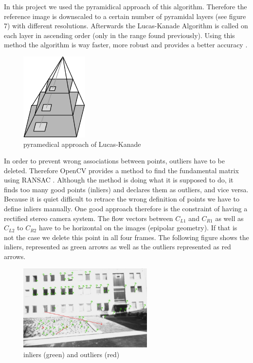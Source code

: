 \documentclass[11pt]{article}
\begin{document}
	In this project we used the pyramidical approach of this algorithm. Therefore the reference image is downscaled to a certain number of pyramidal layers (see figure 7) with different resolutions. Afterwards the Lucas-Kanade Algorithm is called on each layer in ascending order (only in the range found previously). Using this method the algorithm is way faster, more robust and provides a better accuracy \cite{Lucas_Kanade_TU_dresden}.

	\begin{figure}[H]
		\centering
		\includegraphics[width=0.3\textwidth]{images/pyramidical.png}
		\caption{pyramedical approach of Lucas-Kanade}
	\end{figure}
	
	In order to prevent wrong associations between points, outliers have to be deleted. Therefore OpenCV provides a method to find the fundamental matrix using RANSAC \cite{findFundamentalMat}. Although the method is doing what it is supposed to do, it finds too many good points (inliers) and declares them as outliers, and vice versa. Because it is quiet difficult to retrace the wrong definition of points we have to define inliers manually. One good approach therefore is the constraint of having a rectified stereo camera system. The flow vectors between $C_{L1}$ and $C_{R1}$ as well as $C_{L2}$ to $C_{R2}$ have to be horizontal on the images (epipolar geometry). If that is not the case we delete this point in all four frames. The following figure shows the inliers, represented as green arrows as well as the outliers represented as red arrows.
	
	\begin{figure}[H]
		\centering
		\includegraphics[width=0.6\textwidth]{images/inlier_outlier3.jpg}
		\caption{inliers (green) and outliers (red)}
	\end{figure}
	
\end{document}
